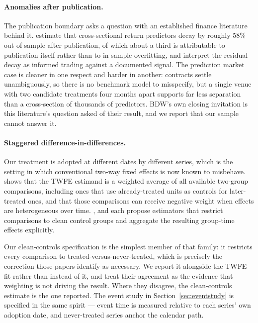\documentclass[preprint,12pt,authoryear]{elsarticle}
\begin{document}
\paragraph{Anomalies after publication.} The publication boundary asks a
question with an established finance literature behind it. \citet{mclean2016}
estimate that cross-sectional return predictors decay by roughly 58\% out of
sample after publication, of which about a third is attributable to publication
itself rather than to in-sample overfitting, and interpret the residual decay as
informed trading against a documented signal. The prediction market case is
cleaner in one respect and harder in another: contracts settle unambiguously, so
there is no benchmark model to misspecify, but a single venue with two candidate
treatments four months apart supports far less separation than a cross-section
of thousands of predictors. BDW's own closing invitation is this literature's
question asked of their result, and we report that our sample cannot answer it.

\paragraph{Staggered difference-in-differences.} Our treatment is adopted at
different dates by different series, which is the setting in which conventional
two-way fixed effects is now known to misbehave. \citet{goodmanbacon2021} shows
that the TWFE estimand is a weighted average of all available two-group
comparisons, including ones that use already-treated units as controls for
later-treated ones, and that those comparisons can receive negative weight when
effects are heterogeneous over time. \citet{callaway2021}, \citet{sun2021} and
\citet{dechaisemartin2020} each propose estimators that restrict comparisons to
clean control groups and aggregate the resulting group-time effects explicitly.

Our clean-controls specification is the simplest member of that family: it
restricts every comparison to treated-versus-never-treated, which is precisely
the correction those papers identify as necessary. We report it alongside the
TWFE fit rather than instead of it, and treat their agreement as the evidence
that weighting is not driving the result. Where they disagree, the
clean-controls estimate is the one reported. The event study in
Section~\ref{sec:eventstudy} is specified in the same spirit --- event time is
measured relative to each series' own adoption date, and never-treated series
anchor the calendar path.
\end{document}
